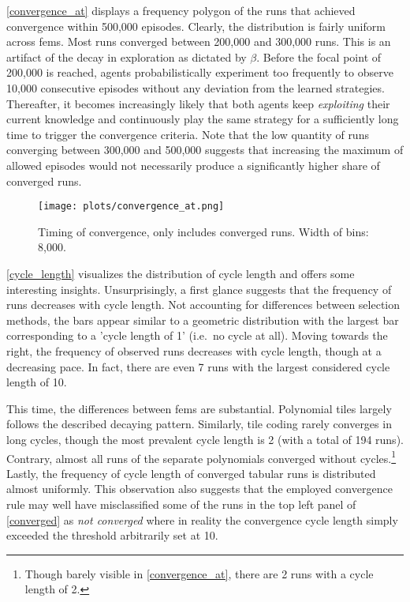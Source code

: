 \autoref{convergence_at} displays a frequency polygon of the runs that achieved convergence within 500,000 episodes. Clearly, the distribution is fairly uniform across \gls{fem}s. Most runs converged between 200,000 and 300,000 runs. This is an artifact of the decay in exploration as dictated by $\beta$. Before the focal point of 200,000 is reached, agents probabilistically experiment too frequently to observe 10,000 consecutive episodes without any deviation from the learned strategies. Thereafter, it becomes increasingly likely that both agents keep \emph{exploiting} their current knowledge and continuously play the same strategy for a sufficiently long time to trigger the convergence criteria. Note that the low quantity of runs converging between 300,000 and 500,000 suggests that increasing the maximum of allowed episodes would not necessarily produce a significantly higher share of converged runs.

\begin{figure}
	\texttt{[image: plots/convergence\_at.png]}
	\caption[Timing of convergence]{Timing of convergence, only includes converged runs. Width of bins: 8,000.}
	\label{convergence_at}
\end{figure}

\autoref{cycle_length} visualizes the distribution of cycle length and offers some interesting insights. Unsurprisingly, a first glance suggests that the frequency of runs decreases with cycle length. Not accounting for differences between selection methods, the bars appear similar to a geometric distribution with the largest bar corresponding to a 'cycle length of 1' (i.e.\ no cycle at all). Moving towards the right, the frequency of observed runs decreases with cycle length, though at a decreasing pace. In fact, there are even 7 runs with the largest considered cycle length of 10.

This time, the differences between \gls{fem}s are substantial. Polynomial tiles largely follows the described decaying pattern. Similarly, tile coding rarely converges in long cycles, though the most prevalent cycle length is 2 (with a total of 194 runs). Contrary, almost all runs of the separate polynomials converged without cycles.\footnote{Though barely visible in \autoref{convergence_at}, there are 2 runs with a cycle length of 2.} Lastly, the frequency of cycle length of converged tabular runs is distributed almost uniformly. This observation also suggests that the employed convergence rule may well have misclassified some of the runs in the top left panel of \autoref{converged} as \emph{not converged} where in reality the convergence cycle length simply exceeded the threshold arbitrarily set at 10. 

